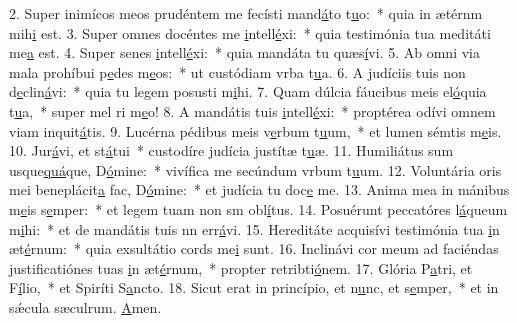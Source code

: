 2. Super inimícos meos prudéntem me fecísti mand\uline{á}to t\uline{u}o:~* quia in ætérnm mih\uline{i} est.
3. Super omnes docéntes me \uline{i}ntell\uline{é}xi:~* quia testimónia tua meditáti me\uline{a} est.
4. Super senes \uline{i}ntell\uline{é}xi:~* quia mandáta tu quæs\uline{í}vi.
5. Ab omni via mala prohíbui p\uline{e}des m\uline{e}os:~* ut custódiam vrba t\uline{u}a.
6. A judíciis tuis non d\uline{e}clin\uline{á}vi:~* quia tu legem posusti m\uline{i}hi.
7. Quam dúlcia fáucibus meis el\uline{ó}quia t\uline{u}a,~* super mel ri m\uline{e}o!
8. A mandátis tuis \uline{i}ntell\uline{é}xi:~* proptérea odívi omnem viam inquit\uline{á}tis.
9. Lucérna pédibus meis v\uline{e}rbum t\uline{u}um,~* et lumen sémtis m\uline{e}is.
10. Jur\uline{á}vi, et st\uline{á}tui~* custodíre judícia justítæ t\uline{u}æ.
11. Humiliátus sum usque\uline{quá}que, D\uline{ó}mine:~* vivífica me secúndum vrbum t\uline{u}um.
12. Voluntária oris mei beneplácit\uline{a} fac, D\uline{ó}mine:~* et judícia tu doc\uline{e} me.
13. Anima mea in mánibus m\uline{e}is s\uline{e}mper:~* et legem tuam non sm obl\uline{í}tus.
14. Posuérunt peccatóres l\uline{á}queum m\uline{i}hi:~* et de mandátis tuis nn err\uline{á}vi.
15. Hereditáte acquisívi testimónia tua \uline{i}n æt\uline{é}rnum:~* quia exsultátio cords me\uline{i} sunt.
16. Inclinávi cor meum ad faciéndas justificatiónes tuas \uline{i}n æt\uline{é}rnum,~* propter retribti\uline{ó}nem.
17. Glória P\uline{a}tri, et F\uline{í}lio,~* et Spiríti S\uline{a}ncto.
18. Sicut erat in princípio, et n\uline{u}nc, et s\uline{e}mper,~* et in sǽcula sæculrum. \uline{A}men.
